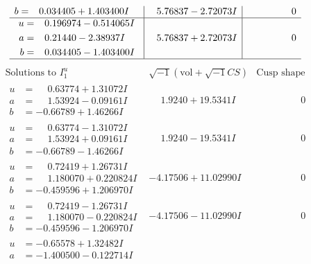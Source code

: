 \documentclass[1p]{elsarticle_modified}
\theoremstyle{definition}
\newcommand{\I}{\sqrt{-1}}
\begin{document}
$$\begin{array}{c|c|c}
\begin{aligned}
b &= \phantom{-}0.034405 + 1.403400 I\end{aligned}
 & \phantom{-}5.76837 - 2.72073 I & \phantom{-0.000000 } 0 \\ \hline\begin{aligned}
u &= \phantom{-}0.196974 - 0.514065 I \\
a &= \phantom{-}0.21440 - 2.38937 I \\
b &= \phantom{-}0.034405 - 1.403400 I\end{aligned}
 & \phantom{-}5.76837 + 2.72073 I & \phantom{-0.000000 } 0\\
 \hline 
 \end{array}$$\newpage$$\begin{array}{c|c|c}  
\text{Solutions to }I^u_{1}& \I (\text{vol} + \sqrt{-1}CS) & \text{Cusp shape}\\
 \hline 
\begin{aligned}
u &= \phantom{-}0.63774 + 1.31072 I \\
a &= \phantom{-}1.53924 - 0.09161 I \\
b &= -0.66789 + 1.46266 I\end{aligned}
 & \phantom{-}1.9240 + 19.5341 I & \phantom{-0.000000 } 0 \\ \hline\begin{aligned}
u &= \phantom{-}0.63774 - 1.31072 I \\
a &= \phantom{-}1.53924 + 0.09161 I \\
b &= -0.66789 - 1.46266 I\end{aligned}
 & \phantom{-}1.9240 - 19.5341 I & \phantom{-0.000000 } 0 \\ \hline\begin{aligned}
u &= \phantom{-}0.72419 + 1.26731 I \\
a &= \phantom{-}1.180070 + 0.220824 I \\
b &= -0.459596 + 1.206970 I\end{aligned}
 & -4.17506 + 11.02990 I & \phantom{-0.000000 } 0 \\ \hline\begin{aligned}
u &= \phantom{-}0.72419 - 1.26731 I \\
a &= \phantom{-}1.180070 - 0.220824 I \\
b &= -0.459596 - 1.206970 I\end{aligned}
 & -4.17506 - 11.02990 I & \phantom{-0.000000 } 0 \\ \hline\begin{aligned}
u &= -0.65578 + 1.32482 I \\
a &= -1.400500 - 0.122714 I \\

\end{aligned}
\end{array}$$
\end{document}
